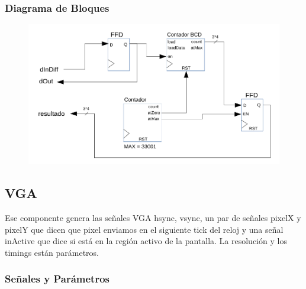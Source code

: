 \documentclass[a4paper]{article}
\begin{document}
\subsubsection{Diagrama de Bloques}

\begin{figure}[!h]
\includegraphics[width=15cm]{img/adc.png}
\end{figure}

\subsection{VGA}

Ese componente genera las señales VGA hsync, vsync, un par de señales pixelX y pixelY que dicen que pixel enviamos en el siguiente tick del reloj y una señal inActive que dice si está en la región activo de la pantalla. La resolución y los timings están parámetros.

\subsubsection{Señales y Parámetros}
\end{document}
